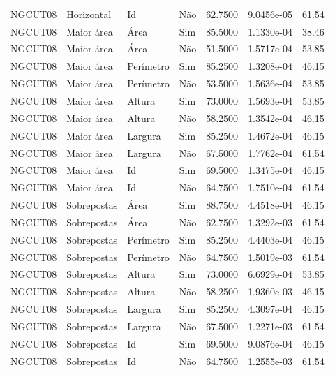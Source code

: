 \begin{tabular}{llllrrr}
NGCUT08   & Horizontal  & Id        & Não         & 62.7500      & 9.0456e-05 & 61.54    \\
NGCUT08   & Maior área  & Área      & Sim         & 85.5000      & 1.1330e-04 & 38.46    \\
NGCUT08   & Maior área  & Área      & Não         & 51.5000      & 1.5717e-04 & 53.85    \\
NGCUT08   & Maior área  & Perímetro & Sim         & 85.2500      & 1.3208e-04 & 46.15    \\
NGCUT08   & Maior área  & Perímetro & Não         & 53.5000      & 1.5636e-04 & 53.85    \\
NGCUT08   & Maior área  & Altura    & Sim         & 73.0000      & 1.5693e-04 & 53.85    \\
NGCUT08   & Maior área  & Altura    & Não         & 58.2500      & 1.3542e-04 & 46.15    \\
NGCUT08   & Maior área  & Largura   & Sim         & 85.2500      & 1.4672e-04 & 46.15    \\
NGCUT08   & Maior área  & Largura   & Não         & 67.5000      & 1.7762e-04 & 61.54    \\
NGCUT08   & Maior área  & Id        & Sim         & 69.5000      & 1.3475e-04 & 46.15    \\
NGCUT08   & Maior área  & Id        & Não         & 64.7500      & 1.7510e-04 & 61.54    \\
NGCUT08   & Sobrepostas & Área      & Sim         & 88.7500      & 4.4518e-04 & 46.15    \\
NGCUT08   & Sobrepostas & Área      & Não         & 62.7500      & 1.3292e-03 & 61.54    \\
NGCUT08   & Sobrepostas & Perímetro & Sim         & 85.2500      & 4.4403e-04 & 46.15    \\
NGCUT08   & Sobrepostas & Perímetro & Não         & 64.7500      & 1.5019e-03 & 61.54    \\
NGCUT08   & Sobrepostas & Altura    & Sim         & 73.0000      & 6.6929e-04 & 53.85    \\
NGCUT08   & Sobrepostas & Altura    & Não         & 58.2500      & 1.9360e-03 & 46.15    \\
NGCUT08   & Sobrepostas & Largura   & Sim         & 85.2500      & 4.3097e-04 & 46.15    \\
NGCUT08   & Sobrepostas & Largura   & Não         & 67.5000      & 1.2271e-03 & 61.54    \\
NGCUT08   & Sobrepostas & Id        & Sim         & 69.5000      & 9.0876e-04 & 46.15    \\
NGCUT08   & Sobrepostas & Id        & Não         & 64.7500      & 1.2555e-03 & 61.54    \\
\hline
\end{tabular}